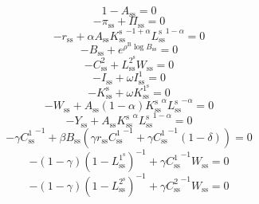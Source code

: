 \begin{equation}
1 - A_\mathrm{ss} = 0
\end{equation}
\begin{equation}
-\pi_\mathrm{ss} + \Pi_\mathrm{ss} = 0
\end{equation}
\begin{equation}
-r_\mathrm{ss} + {\alpha} {A_\mathrm{ss}} {{K^{\mathrm{s}}_\mathrm{ss}}^{-1 + \alpha}} {{L^{\mathrm{s}}_\mathrm{ss}}^{1 - \alpha}} = 0
\end{equation}
\begin{equation}
-B_\mathrm{ss} + e^{{\rho^{\mathrm{B}}} {\log{B_\mathrm{ss}}}} = 0
\end{equation}
\begin{equation}
-C^{\mathrm{2}}_\mathrm{ss} + {L^{\mathrm{2}^{\mathrm{s}}}_\mathrm{ss}} {W_\mathrm{ss}} = 0
\end{equation}
\begin{equation}
-I_\mathrm{ss} + {\omega} {I^{\mathrm{1}}_\mathrm{ss}} = 0
\end{equation}
\begin{equation}
-K^{\mathrm{s}}_\mathrm{ss} + {\omega} {K^{\mathrm{1}^{\mathrm{s}}}_\mathrm{ss}} = 0
\end{equation}
\begin{equation}
-W_\mathrm{ss} + {A_\mathrm{ss}} \left(1 - \alpha\right) {{K^{\mathrm{s}}_\mathrm{ss}}^{\alpha}} {{L^{\mathrm{s}}_\mathrm{ss}}^{-\alpha}} = 0
\end{equation}
\begin{equation}
-Y_\mathrm{ss} + {A_\mathrm{ss}} {{K^{\mathrm{s}}_\mathrm{ss}}^{\alpha}} {{L^{\mathrm{s}}_\mathrm{ss}}^{1 - \alpha}} = 0
\end{equation}
\begin{equation}
-{\gamma} {C^{\mathrm{1}}_\mathrm{ss}}^{-1} + {\beta} {B_\mathrm{ss}} \left({\gamma} {r_\mathrm{ss}} {C^{\mathrm{1}}_\mathrm{ss}}^{-1} + {\gamma} {C^{\mathrm{1}}_\mathrm{ss}}^{-1} \left(1 - \delta\right)\right) = 0
\end{equation}
\begin{equation}
-\left(1 - \gamma\right) \left(1 - L^{\mathrm{1}^{\mathrm{s}}}_\mathrm{ss}\right)^{-1} + {\gamma} {C^{\mathrm{1}}_\mathrm{ss}}^{-1} {W_\mathrm{ss}} = 0
\end{equation}
\begin{equation}
-\left(1 - \gamma\right) \left(1 - L^{\mathrm{2}^{\mathrm{s}}}_\mathrm{ss}\right)^{-1} + {\gamma} {C^{\mathrm{2}}_\mathrm{ss}}^{-1} {W_\mathrm{ss}} = 0
\end{equation}
